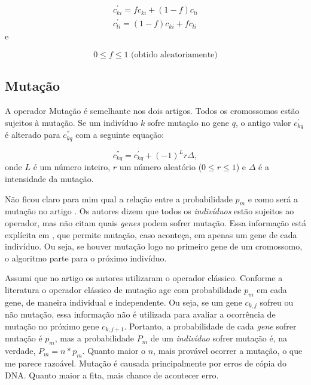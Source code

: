 	\begin{equation}
		\begin{array}{l}
			c^{'}_{ki} = f c_{ki} + (1 - f) c_{li}     \\
			c^{'}_{li} = (1 - f) c_{ki} + f c_{li}
		\end{array}
	\end{equation}
	e
	
	\begin{equation}
	0 \leq f \leq 1 \mbox{       (obtido aleatoriamente)}
	\end{equation}

\subsection{Mutação}

	A operador Mutação é semelhante nos dois artigos. Todos os cromossomos estão sujeitos à mutação. Se um indivíduo $k$ sofre mutação no gene $q$, o antigo valor $c^{'}_{kq}$ é alterado para $c^{''}_{kq}$ com a seguinte equação:

		\begin{equation}\label{eq:mutacao}
			c^{''}_{kq} = c^{'}_{kq} + (-1)^{L} r \Delta,
		\end{equation}
		onde $L$ é um número inteiro, $r$ um número aleatório ($0 \leq r \leq 1$) e $\Delta$ é a intensidade da mutação.
		
		
	Não ficou claro para mim qual a relação entre a probabilidade $p_m$ e como será a mutação no artigo \cite{metodo2004}. Os autores dizem que todos os \emph{indivíduos} estão sujeitos ao operador, mas não citam quais \emph{genes} podem sofrer mutação. Essa informação está explícita em \cite{metodo2011}, que permite mutação, caso aconteça, em apenas um gene de cada indivíduo. Ou seja, se houver mutação logo no primeiro gene de um cromossomo, o algoritmo parte para o próximo indivíduo.
	
	Assumi que no artigo \cite{metodo2004} os autores utilizaram o operador clássico. Conforme a literatura \cite{Mitchell98, Linden2008} o operador clássico de mutação age com probabilidade $p_m$ em cada gene, de maneira individual e independente. Ou seja, se um gene $c_{k,j}$ sofreu ou não mutação, essa informação não é utilizada para avaliar a ocorrência de mutação no próximo gene $c_{k,j+1}$. Portanto, a probabilidade de cada \emph{gene} sofrer mutação é $p_m$, mas a probabilidade $P_m$ de um \emph{indivíduo} sofrer mutação é, na verdade, $P_m = n*p_m$. Quanto maior o $n$, mais provável ocorrer a mutação, o que me parece razoável. Mutação é causada principalmente por erros de cópia do DNA. Quanto maior a fita, mais chance de acontecer erro.

